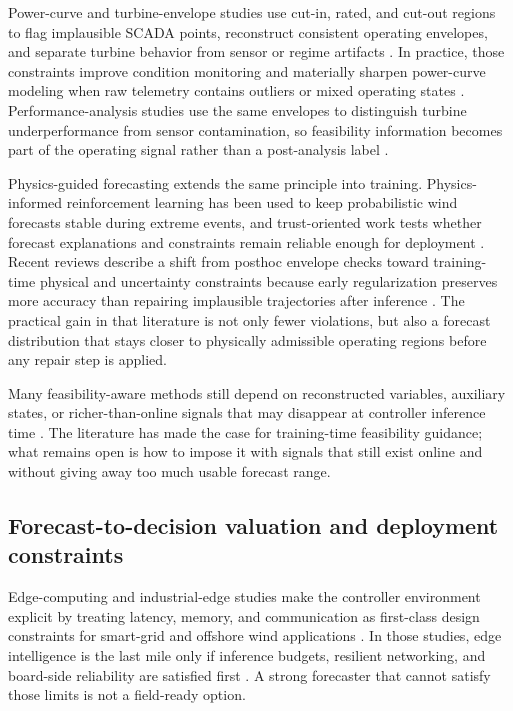﻿\documentclass[review,1p,times]{elsarticle}
\begin{document}
Power-curve and turbine-envelope studies use cut-in, rated, and cut-out regions to flag implausible SCADA points, reconstruct consistent operating envelopes, and separate turbine behavior from sensor or regime artifacts \citep{astolfi2015datamining,martincalzada2025optimized,burton2011wind,iec61400_12_1_2017}. In practice, those constraints improve condition monitoring and materially sharpen power-curve modeling when raw telemetry contains outliers or mixed operating states \citep{astolfi2015datamining,martincalzada2025optimized}. Performance-analysis studies use the same envelopes to distinguish turbine underperformance from sensor contamination, so feasibility information becomes part of the operating signal rather than a post-analysis label \citep{astolfi2015datamining,burton2011wind}.

Physics-guided forecasting extends the same principle into training. Physics-informed reinforcement learning has been used to keep probabilistic wind forecasts stable during extreme events, and trust-oriented work tests whether forecast explanations and constraints remain reliable enough for deployment \citep{liu2024physics,liao2024trust}. Recent reviews describe a shift from posthoc envelope checks toward training-time physical and uncertainty constraints because early regularization preserves more accuracy than repairing implausible trajectories after inference \citep{parsa2025physics,wang2025review}. The practical gain in that literature is not only fewer violations, but also a forecast distribution that stays closer to physically admissible operating regions before any repair step is applied.

Many feasibility-aware methods still depend on reconstructed variables, auxiliary states, or richer-than-online signals that may disappear at controller inference time \citep{liu2024physics,liao2024trust,martincalzada2025optimized}. The literature has made the case for training-time feasibility guidance; what remains open is how to impose it with signals that still exist online and without giving away too much usable forecast range.

\subsection{Forecast-to-decision valuation and deployment constraints}
\label{subsec:related_dispatch}

Edge-computing and industrial-edge studies make the controller environment explicit by treating latency, memory, and communication as first-class design constraints for smart-grid and offshore wind applications \citep{zhou2019edge,gooi2023edgeintelligence,mwangi2024sdniiotedge}. In those studies, edge intelligence is the last mile only if inference budgets, resilient networking, and board-side reliability are satisfied first \citep{zhou2019edge,gooi2023edgeintelligence,mwangi2024sdniiotedge}. A strong forecaster that cannot satisfy those limits is not a field-ready option.
\end{document}
